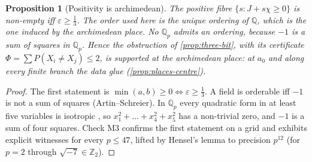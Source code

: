 \documentclass[11pt]{article}
\newtheorem{proposition}[theorem]{Proposition}
\theoremstyle{definition}
\begin{document}
\begin{proposition}[Positivity is archimedean]\label{prop:places-order}
The positive fibre $\{s:J+s\chi\geq0\}$ is non-empty iff $\varepsilon\geq\tfrac13$. The order used here is the unique ordering of
$\mathbb{Q}$, which is the one induced by the archimedean place. No $\mathbb{Q}_p$ admits an ordering, because $-1$ is a sum of squares
in $\mathbb{Q}_p$. Hence the obstruction of \cref{prop:three-bit}, with its certificate $\Phi=\sum P(X_i\neq X_j)\leq2$, is supported at
the archimedean place: at $a_0$ and along every finite branch the data glue (\cref{prop:places-centre}).
\end{proposition}
\begin{proof}
The first statement is $\min(a,b)\geq0\iff\varepsilon\geq\tfrac13$. A field is orderable iff $-1$ is not a sum of squares (Artin--Schreier).
In $\mathbb{Q}_p$ every quadratic form in at least five variables is isotropic \cite[Ch.~IV, Thm.~6]{Serre1973}, so
$x_1^2+\dots+x_4^2+x_5^2$ has a non-trivial zero, and $-1$ is a sum of four squares. Check M3 confirms the first statement on a grid and
exhibits explicit witnesses for every $p\leq47$, lifted by Hensel's lemma to precision $p^{12}$ (for $p=2$ through $\sqrt{-7}\in\mathbb{Z}_2$).
\end{proof}
\end{document}
